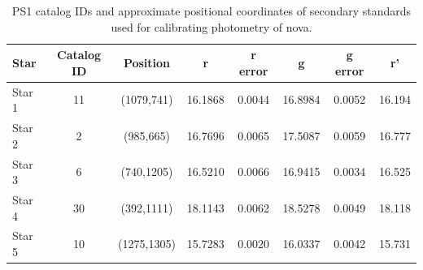 \documentclass{tda}
\begin{document}
	\begin{table}
		\centering
		\begin{tabular} {l c c c c c c c}
			\toprule
			\textbf{Star} & \textbf{Catalog ID} & \textbf{Position} & \textbf{r} & \textbf{r error} & \textbf{g} & \textbf{g error} & \textbf{r'} \\
			\midrule
			Star 1 & 11 & (1079,741) & 16.1868 & 0.0044 & 16.8984 & 0.0052 & 16.194 \\
			Star 2 & 2 & (985,665) & 16.7696 & 0.0065 & 17.5087 & 0.0059 & 16.777 \\
			Star 3 & 6 & (740,1205) & 16.5210 & 0.0066 & 16.9415 & 0.0034 & 16.525 \\
			Star 4 & 30 & (392,1111) & 18.1143 & 0.0062 & 18.5278 & 0.0049 & 18.118 \\
			Star 5 & 10 & (1275,1305) & 15.7283 & 0.0020 & 16.0337 & 0.0042 & 15.731 \\
			\bottomrule
		\end{tabular}
		\caption{PS1 catalog IDs and approximate positional coordinates of secondary standards used for calibrating photometry of nova.}
		\label{table:secondary_standards}
	\end{table}
\end{document}

